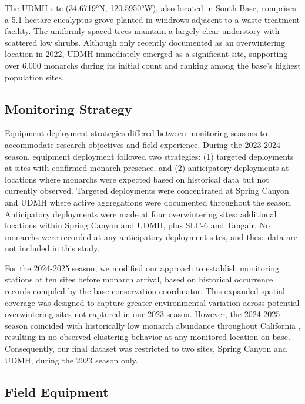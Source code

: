 The UDMH site (34.6719°N, 120.5950°W), also located in South Base, comprises a 5.1-hectare eucalyptus grove planted in windrows adjacent to a waste treatment facility. The uniformly spaced trees maintain a largely clear understory with scattered low shrubs. Although only recently documented as an overwintering location in 2022, UDMH immediately emerged as a significant site, supporting over 6,000 monarchs during its initial count and ranking among the base's highest population sites.


\subsection{Monitoring Strategy}

Equipment deployment strategies differed between monitoring seasons to accommodate research objectives and field experience. During the 2023-2024 season, equipment deployment followed two strategies: (1) targeted deployments at sites with confirmed monarch presence, and (2) anticipatory deployments at locations where monarchs were expected based on historical data but not currently observed. Targeted deployments were concentrated at Spring Canyon and UDMH where active aggregations were documented throughout the season. Anticipatory deployments were made at four overwintering sites: additional locations within Spring Canyon and UDMH, plus SLC-6 and Tangair. No monarchs were recorded at any anticipatory deployment sites, and these data are not included in this study.

For the 2024-2025 season, we modified our approach to establish monitoring stations at ten sites before monarch arrival, based on historical occurrence records compiled by the base conservation coordinator. This expanded spatial coverage was designed to capture greater environmental variation across potential overwintering sites not captured in our 2023 season. However, the 2024-2025 season coincided with historically low monarch abundance throughout California \autocite{xercesWesternMonarchThanksgiving2025}, resulting in no observed clustering behavior at any monitored location on base. Consequently, our final dataset was restricted to two sites, Spring Canyon and UDMH, during the 2023 season only.

\subsection{Field Equipment}

